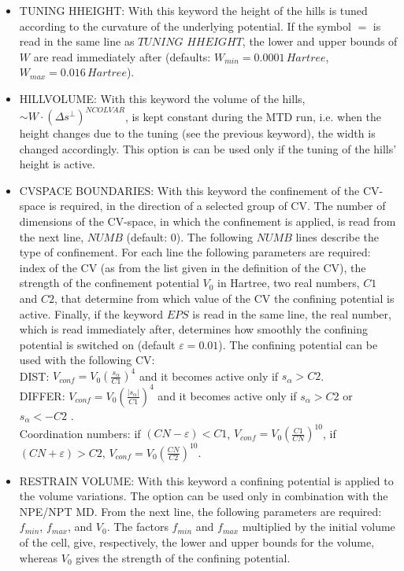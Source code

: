 \documentclass[twoside,10pt,titlepage,a4paper]{article}
\begin{document}
\begin{itemize}
\item{TUNING HHEIGHT:} With this keyword the height of the hills is
tuned according to the curvature of the underlying potential.
If the symbol $=$ is read in the same line as $TUNING$ $ HHEIGHT$,
the lower and upper bounds of $W$ are read immediately after
(defaults: $W_{min}=0.0001 \, Hartree$, $W_{max}=0.016 \, Hartree$).

\item{HILLVOLUME:} With this keyword the volume of the hills,
$\sim W\cdot (\Delta s^{\perp})^{NCOLVAR} $, is kept constant
during the MTD run, i.e. when the height changes due to the
tuning (see the previous keyword), the width is changed accordingly.
This option is can be used only if the tuning of the hills' height is active.

\item{CVSPACE BOUNDARIES:} With this keyword the confinement of the
CV-space is required, in the direction of a selected group of CV.
The number of dimensions of the CV-space, in which the confinement
is applied, is read from the next line, $NUMB$ (default: 0).
The following $NUMB$ lines describe the type of confinement.
For each line the following parameters are required: index of the
CV (as from the list given in the definition of the CV),
the strength of the confinement potential $V_{0}$ in Hartree, two real numbers,
$C1$ and $C2$, that determine from which value of the CV the
confining potential is active. Finally, if the keyword $EPS$
is read in the same line, the real number, which is read
immediately after, determines how smoothly the confining
potential is switched on (default $\varepsilon = 0.01$).
The confining potential can be used with the following CV: \\
DIST: $V_{conf} = V_{0}\left(\frac{s_{\alpha}}{C1}\right)^{4}$
and it becomes active only if $s_{\alpha} > C2$. \\
DIFFER:  $V_{conf} = V_{0}\left(\frac{\vert s_{\alpha}\vert}{C1}\right)^{4}$
and it becomes active only if $s_{\alpha} > C2$ or $s_{\alpha} < -C2$ . \\
Coordination numbers: if $(CN-\varepsilon) < C1$, $V_{conf} =
V_{0} (\frac{C1}{CN})^{10}$, if $(CN+\varepsilon) > C2$,
$V_{conf} = V_{0} (\frac{CN}{C2})^{10}$.

\item{RESTRAIN VOLUME:} With this keyword a confining potential is
applied to the volume variations. The option can be used only in
combination with the NPE/NPT MD. From the next line, the following parameters are
required: $f_{min}$, $f_{max}$, and $V_0$. The factors $f_{min}$ and $f_{max}$
multiplied by the initial volume of the cell, give, respectively,
the lower and upper bounds for the volume, whereas $V_0$ gives the
strength of the confining potential.


\end{itemize}
\end{document}
